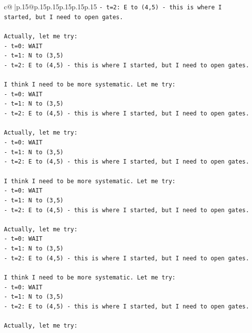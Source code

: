 \documentclass{article}
\begin{document}
{\begin{supertabular}{c@{$\;$}|p{.15\linewidth}@{}p{.15\linewidth}p{.15\linewidth}p{.15\linewidth}p{.15\linewidth}p{.15\linewidth}}
{{{\texttt{{-} t=2: E to (4,5) {-} this is where I started, but I need to open gates.} \\
\\ 
\texttt{Actually, let me try:} \\
\texttt{{-} t=0: WAIT} \\
\texttt{{-} t=1: N to (3,5)} \\
\texttt{{-} t=2: E to (4,5) {-} this is where I started, but I need to open gates.} \\
\\ 
\texttt{I think I need to be more systematic. Let me try:} \\
\texttt{{-} t=0: WAIT} \\
\texttt{{-} t=1: N to (3,5)} \\
\texttt{{-} t=2: E to (4,5) {-} this is where I started, but I need to open gates.} \\
\\ 
\texttt{Actually, let me try:} \\
\texttt{{-} t=0: WAIT} \\
\texttt{{-} t=1: N to (3,5)} \\
\texttt{{-} t=2: E to (4,5) {-} this is where I started, but I need to open gates.} \\
\\ 
\texttt{I think I need to be more systematic. Let me try:} \\
\texttt{{-} t=0: WAIT} \\
\texttt{{-} t=1: N to (3,5)} \\
\texttt{{-} t=2: E to (4,5) {-} this is where I started, but I need to open gates.} \\
\\ 
\texttt{Actually, let me try:} \\
\texttt{{-} t=0: WAIT} \\
\texttt{{-} t=1: N to (3,5)} \\
\texttt{{-} t=2: E to (4,5) {-} this is where I started, but I need to open gates.} \\
\\ 
\texttt{I think I need to be more systematic. Let me try:} \\
\texttt{{-} t=0: WAIT} \\
\texttt{{-} t=1: N to (3,5)} \\
\texttt{{-} t=2: E to (4,5) {-} this is where I started, but I need to open gates.} \\
\\ 
\texttt{Actually, let me try:} \\
}}}
\end{supertabular}}
\end{document}
